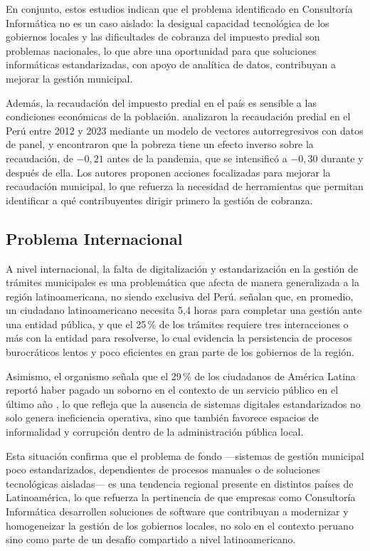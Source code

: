 \documentclass[12pt,a4paper]{report}
\begin{document}
En conjunto, estos estudios indican que el problema identificado en Consultoría Informática no es un caso aislado: la desigual capacidad tecnológica de los gobiernos locales y las dificultades de cobranza del impuesto predial son problemas nacionales, lo que abre una oportunidad para que soluciones informáticas estandarizadas, con apoyo de analítica de datos, contribuyan a mejorar la gestión municipal.

Además, la recaudación del impuesto predial en el país es sensible a las condiciones económicas de la población. \textcite{cayatopa2026} analizaron la recaudación predial en el Perú entre 2012 y 2023 mediante un modelo de vectores autorregresivos con datos de panel, y encontraron que la pobreza tiene un efecto inverso sobre la recaudación, de $-0{,}21$ antes de la pandemia, que se intensificó a $-0{,}30$ durante y después de ella. Los autores proponen acciones focalizadas para mejorar la recaudación municipal, lo que refuerza la necesidad de herramientas que permitan identificar a qué contribuyentes dirigir primero la gestión de cobranza.

\subsection{Problema Internacional}

A nivel internacional, la falta de digitalización y estandarización en la gestión de trámites municipales es una problemática que afecta de manera generalizada a la región latinoamericana, no siendo exclusiva del Perú. \textcite{bid2018} señalan que, en promedio, un ciudadano latinoamericano necesita 5,4 horas para completar una gestión ante una entidad pública, y que el 25\,\% de los trámites requiere tres interacciones o más con la entidad para resolverse, lo cual evidencia la persistencia de procesos burocráticos lentos y poco eficientes en gran parte de los gobiernos de la región.

Asimismo, el organismo señala que el 29\,\% de los ciudadanos de América Latina reportó haber pagado un soborno en el contexto de un servicio público en el último año \parencite{bid2018}, lo que refleja que la ausencia de sistemas digitales estandarizados no solo genera ineficiencia operativa, sino que también favorece espacios de informalidad y corrupción dentro de la administración pública local.

Esta situación confirma que el problema de fondo —sistemas de gestión municipal poco estandarizados, dependientes de procesos manuales o de soluciones tecnológicas aisladas— es una tendencia regional presente en distintos países de Latinoamérica, lo que refuerza la pertinencia de que empresas como Consultoría Informática desarrollen soluciones de software que contribuyan a modernizar y homogeneizar la gestión de los gobiernos locales, no solo en el contexto peruano sino como parte de un desafío compartido a nivel latinoamericano.
\end{document}
